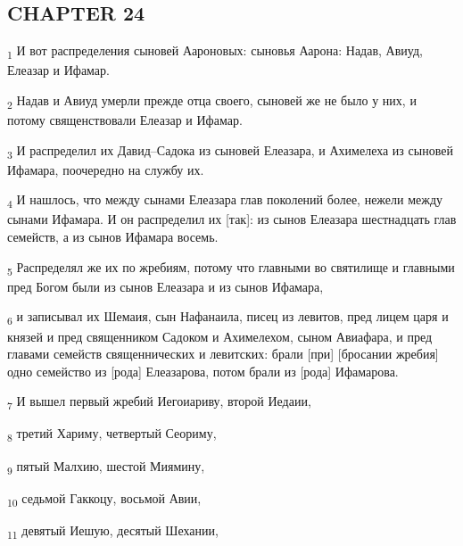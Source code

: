 \subsection{CHAPTER 24}
\begin{tcolorbox}
\textsubscript{1} И вот распределения сыновей Аароновых: сыновья Аарона: Надав, Авиуд, Елеазар и Ифамар.
\end{tcolorbox}
\begin{tcolorbox}
\textsubscript{2} Надав и Авиуд умерли прежде отца своего, сыновей же не было у них, и потому священствовали Елеазар и Ифамар.
\end{tcolorbox}
\begin{tcolorbox}
\textsubscript{3} И распределил их Давид--Садока из сыновей Елеазара, и Ахимелеха из сыновей Ифамара, поочередно на службу их.
\end{tcolorbox}
\begin{tcolorbox}
\textsubscript{4} И нашлось, что между сынами Елеазара глав поколений более, нежели между сынами Ифамара. И он распределил их [так]: из сынов Елеазара шестнадцать глав семейств, а из сынов Ифамара восемь.
\end{tcolorbox}
\begin{tcolorbox}
\textsubscript{5} Распределял же их по жребиям, потому что главными во святилище и главными пред Богом были из сынов Елеазара и из сынов Ифамара,
\end{tcolorbox}
\begin{tcolorbox}
\textsubscript{6} и записывал их Шемаия, сын Нафанаила, писец из левитов, пред лицем царя и князей и пред священником Садоком и Ахимелехом, сыном Авиафара, и пред главами семейств священнических и левитских: брали [при] [бросании жребия] одно семейство из [рода] Елеазарова, потом брали из [рода] Ифамарова.
\end{tcolorbox}
\begin{tcolorbox}
\textsubscript{7} И вышел первый жребий Иегоиариву, второй Иедаии,
\end{tcolorbox}
\begin{tcolorbox}
\textsubscript{8} третий Хариму, четвертый Сеориму,
\end{tcolorbox}
\begin{tcolorbox}
\textsubscript{9} пятый Малхию, шестой Миямину,
\end{tcolorbox}
\begin{tcolorbox}
\textsubscript{10} седьмой Гаккоцу, восьмой Авии,
\end{tcolorbox}
\begin{tcolorbox}
\textsubscript{11} девятый Иешую, десятый Шехании,
\end{tcolorbox}
